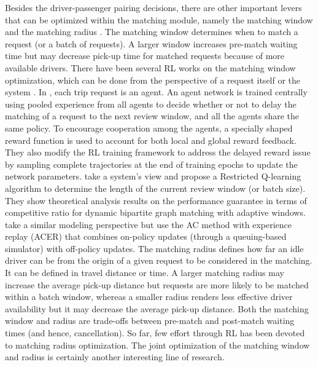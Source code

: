 \documentclass{article}
\begin{document}
Besides the driver-passenger pairing decisions, there are other important levers that can be optimized within the matching module, namely the matching window and the matching radius \citep{yang2020optimizing}. The matching window determines when to match a request (or a batch of requests). A larger window increases pre-match waiting time but may decrease pick-up time for matched requests because of more available drivers. There have been several RL works on the matching window optimization, which can be done from the perspective of a request itself \citep{ke2020learning} or the system \citep{wang2019adaptive,qin2021optimizing}. In \citep{ke2020learning}, each trip request is an agent. An agent network is trained centrally using pooled experience from all agents to decide whether or not to delay the matching of a request to the next review window, and all the agents share the same policy. To encourage cooperation among the agents, a specially shaped reward function is used to account for both local and global reward feedback. They also modify the RL training framework to address the delayed reward issue by sampling complete trajectories at the end of training epochs to update the network parameters. \cite{wang2019adaptive} take a system's view and 
propose a Restricted Q-learning algorithm to determine the length of the current review window (or batch size). They show theoretical analysis results on the performance guarantee in terms of competitive ratio for dynamic bipartite graph matching with adaptive windows. \cite{qin2021optimizing} take a similar modeling perspective but use the AC method with experience replay (ACER) \citep{wang2016sample} that combines on-policy updates (through a queuing-based simulator) with off-policy updates. The matching radius defines how far an idle driver can be from the origin of a given request to be considered in the matching. It can be defined in travel distance or time. A larger matching radius may increase the average pick-up distance but requests are more likely to be matched within a batch window, whereas a smaller radius renders less effective driver availability but it may decrease the average pick-up distance. Both the matching window and radius are trade-offs between pre-match and post-match waiting times (and hence, cancellation).
So far, few effort through RL has been devoted to matching radius optimization. The joint optimization of the matching window and radius is certainly another interesting line of research.

\end{document}
